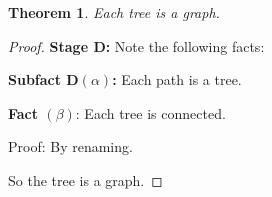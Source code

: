 \documentclass{article}
\newtheorem{theorem}{Theorem}
\begin{document}
\begin{theorem} Each tree is a graph. \end{theorem}
\begin{proof}
\textbf{Stage D:} Note the following facts:

\noindent\textbf{Subfact D$(\alpha)$:} Each path is a tree.

\smallskip\noindent
\textbf{Fact $(\beta)$}: Each tree is connected.

\smallskip\noindent
Proof: By renaming.

So the tree is a graph.
\end{proof}
\end{document}
